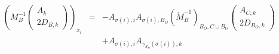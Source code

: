 \documentclass[a4paper]{article}
\begin{document}
\begin{enumerate}
\begin{eqnarray}
\label{eq:r1_i_B_S_k_N_O}
\left(M_{B}^{-1}
           \left(\begin{array}{c}
                   A_{k} \\
	           \hline
	           2D_{B, k}
	         \end{array}
           \right)
\right)_{x_{i}}
&=&
-A_{\sigma(i),i}A_{\sigma(i), B_{O}}\left(\check{M}_{B}^{-1}\right)_{B_{O},
  C \cup B_{O}}
\left(\begin{array}{c}
        A_{C,k} \\
	\hline
	2D_{B_{O},k}
       \end{array}
\right)
\nonumber \\
&&
+A_{\sigma(i), i}A_{\gamma_{S_{B}}(\sigma(i)), k}
\end{eqnarray}
\end{enumerate}
\end{document}
